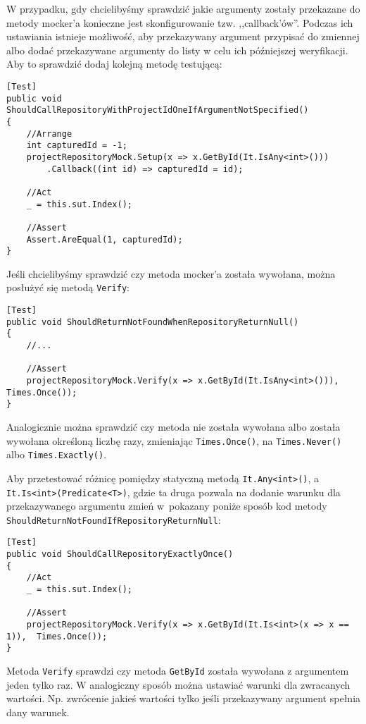 
W przypadku, gdy chcielibyśmy sprawdzić jakie argumenty zostały przekazane do metody mocker'a konieczne jest skonfigurowanie tzw. ,,callback'ów''. Podczas ich ustawiania istnieje możliwość, aby przekazywany argument przypisać do zmiennej albo dodać przekazywane argumenty do listy w celu ich późniejszej weryfikacji. Aby to sprawdzić dodaj kolejną metodę testującą:
\begin{lstlisting}
[Test]
public void ShouldCallRepositoryWithProjectIdOneIfArgumentNotSpecified()
{
	//Arrange
	int capturedId = -1;
	projectRepositoryMock.Setup(x => x.GetById(It.IsAny<int>()))
		.Callback((int id) => capturedId = id);
	
	//Act
	_ = this.sut.Index();
	
	//Assert
	Assert.AreEqual(1, capturedId);
}
\end{lstlisting}


Jeśli chcielibyśmy sprawdzić czy metoda mocker'a została wywołana, można posłużyć się metodą \texttt{Verify}:
\begin{lstlisting}
[Test]
public void ShouldReturnNotFoundWhenRepositoryReturnNull()
{
	//...
	
	//Assert
	projectRepositoryMock.Verify(x => x.GetById(It.IsAny<int>())),  Times.Once());
}
\end{lstlisting}
Analogicznie można sprawdzić czy metoda nie została wywołana albo została wywołana określoną liczbę razy, zmieniając \texttt{Times.Once()}, na \texttt{Times.Never()} albo \texttt{Times.Exactly()}.

Aby przetestować różnicę pomiędzy statyczną metodą \texttt{It.Any<int>()}, a \texttt{It.Is<int>(Predicate<T>)}, gdzie ta druga pozwala na dodanie warunku dla przekazywanego argumentu zmień w~pokazany poniże sposób kod metody \texttt{ShouldReturnNotFoundIfRepositoryReturnNull}:
\begin{lstlisting}
[Test]
public void ShouldCallRepositoryExactlyOnce()
{
	//Act
	_ = this.sut.Index();
	
	//Assert
	projectRepositoryMock.Verify(x => x.GetById(It.Is<int>(x => x == 1)),  Times.Once());
}
\end{lstlisting}
Metoda \texttt{Verify} sprawdzi czy metoda \texttt{GetById} została wywołana z argumentem jeden tylko raz. W analogiczny sposób można ustawiać warunki dla zwracanych wartości. Np. zwrócenie jakieś wartości tylko jeśli przekazywany argument spełnia dany warunek.